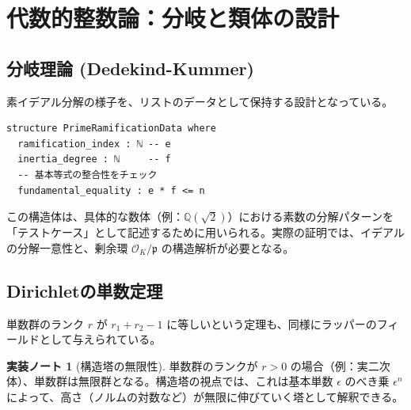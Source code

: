 \documentclass[a4paper,11pt]{ltjsarticle}
\theoremstyle{definition}
\newtheorem{remark}{実装ノート}[section]
\newcommand{\Q}{\mathbb{Q}}
\newcommand{\Oint}{\mathcal{O}}
\begin{document}
\section{代数的整数論：分岐と類体の設計}

\subsection{分岐理論 (Dedekind-Kummer)}
素イデアル分解の様子を、リストのデータとして保持する設計となっている。

\begin{lstlisting}[caption=分岐データ]
structure PrimeRamificationData where
  ramification_index : ℕ -- e
  inertia_degree : ℕ     -- f
  -- 基本等式の整合性をチェック
  fundamental_equality : e * f <= n
\end{lstlisting}

この構造体は、具体的な数体（例：$\Q(\sqrt{2})$）における素数の分解パターンを「テストケース」として記述するために用いられる。実際の証明では、イデアルの分解一意性と、剰余環 $\Oint_K/\mathfrak{p}$ の構造解析が必要となる。

\subsection{Dirichletの単数定理}
単数群のランク $r$ が $r_1 + r_2 - 1$ に等しいという定理も、同様にラッパーのフィールドとして与えられている。

\begin{remark}[構造塔の無限性]
単数群のランクが $r > 0$ の場合（例：実二次体）、単数群は無限群となる。構造塔の視点では、これは基本単数 $\epsilon$ のべき乗 $\epsilon^n$ によって、高さ（ノルムの対数など）が無限に伸びていく塔として解釈できる。
\begin{center}
\end{center}
\end{remark}
\end{document}
